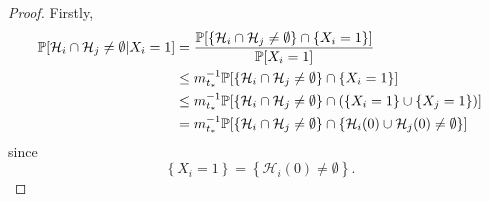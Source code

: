 	\begin{proof}
		Firstly,
		\begin{align}
			\mathbb{P}[\mathcal{H}_i \cap \mathcal{H}_j \neq \emptyset | X_i = 1] &= \frac{\mathbb{P}[\left\{\mathcal{H}_i \cap \mathcal{H}_j \neq \emptyset\right\} \cap \{X_i = 1\}]}{\mathbb{P}[X_i = 1]}\\
			&\leq m_{t_*}^{-1} \mathbb{P}[\left\{\mathcal{H}_i \cap \mathcal{H}_j \neq \emptyset\right\} \cap \{X_i = 1\}]\\
			&\leq  m_{t_*}^{-1} \mathbb{P}[\left\{\mathcal{H}_i \cap \mathcal{H}_j \neq \emptyset\right\} \cap \left(\{X_i = 1\} \cup \{X_j = 1\}\right)]\\
			&= m_{t_*}^{-1} \mathbb{P}[\left\{\mathcal{H}_i \cap \mathcal{H}_j \neq \emptyset\right\} \cap \left\{\mathcal{H}_i(0) \cup \mathcal{H}_j(0) \neq \emptyset\right\}]
			\label{eq:prob in red star}
		\end{align}
		since
		\begin{equation}
			\left\{X_i = 1\right\} = \left\{\mathcal{H}_i(0) \neq \emptyset\right\}.
		\end{equation}

\end{proof}
